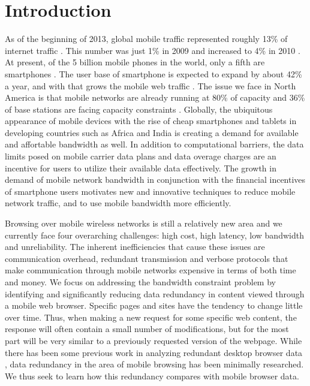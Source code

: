 \section{Introduction}
As of the beginning of 2013, global mobile traffic represented roughly 13\% of internet traffic \cite{?}. This number was just 1\% in 2009 and increased to 4\% in 2010 \cite{?}. At present, of the 5 billion mobile phones in the world, only a fifth are smartphones \cite{?}. The user base of smartphone is expected to expand by about 42\% a year, and with that grows the mobile web traffic \cite{?}. The issue we face in North America is that mobile networks are already running at 80\% of capacity and 36\% of base stations are facing capacity constraints \cite{?}. Globally, the ubiquitous appearance of mobile devices with the rise of cheap smartphones and tablets in developing countries such as Africa and India is creating a demand for available and affortable bandwidth as well. In addition to computational barriers, the data limits posed on mobile carrier data plans and data overage charges are an incentive for users to utilize their available data effectively. The growth in demand of mobile network bandwidth in conjunction with the financial incentives of smartphone users motivates new and innovative techniques to reduce mobile network traffic, and to use mobile bandwidth more efficiently. 


Browsing over mobile wireless networks is still a relatively new area and we currently face four overarching challenges: high cost, high latency, low bandwidth and unreliability. The inherent inefficiencies that cause these issues are communication overhead, redundant transmission and %
verbose protocols that make communication through mobile networks expensive in terms of both time and money. 
We focus on addressing the bandwidth constraint problem by identifying and significantly reducing data redundancy in content viewed through a mobile web browser. Specific pages and sites have the tendency to change little over time. Thus, when making a new request for some specific web content, the response will often contain a small number of modifications, but for the most part will be very similar to a previously requested version of the webpage. While there has been some previous work in analyzing redundant desktop browser data \cite{?}, data redundancy in the area of mobile browsing has been minimally researched. We thus seek to learn how this redundancy compares with mobile browser data. %

